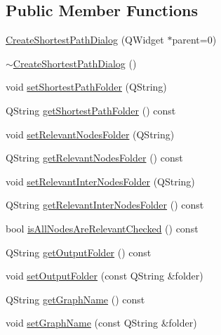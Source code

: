 \subsection*{Public Member Functions}
\begin{DoxyCompactItemize}
\item 
\mbox{\hyperlink{class_create_shortest_path_dialog_a4c0847ff271b3b53aff8c4529685cc0b}{Create\+Shortest\+Path\+Dialog}} (Q\+Widget $\ast$parent=0)
\item 
\mbox{\hyperlink{class_create_shortest_path_dialog_aeb448f0b0a0a2ebe6b38472a0bd7e3a7}{$\sim$\+Create\+Shortest\+Path\+Dialog}} ()
\item 
void \mbox{\hyperlink{class_create_shortest_path_dialog_a12534d02daec57940ade7608812e4b78}{set\+Shortest\+Path\+Folder}} (Q\+String)
\item 
Q\+String \mbox{\hyperlink{class_create_shortest_path_dialog_a7c7cf75fe1d3687fce478419751dcd21}{get\+Shortest\+Path\+Folder}} () const
\item 
void \mbox{\hyperlink{class_create_shortest_path_dialog_a1ea2b0417bf537af0c22f9778382e24d}{set\+Relevant\+Nodes\+Folder}} (Q\+String)
\item 
Q\+String \mbox{\hyperlink{class_create_shortest_path_dialog_ac5dfd0b531fbc8cf751dc39256ffe20d}{get\+Relevant\+Nodes\+Folder}} () const
\item 
void \mbox{\hyperlink{class_create_shortest_path_dialog_ad63cdc8ec6b1d5e86cb6eb293d64af78}{set\+Relevant\+Inter\+Nodes\+Folder}} (Q\+String)
\item 
Q\+String \mbox{\hyperlink{class_create_shortest_path_dialog_a324440a54aebdb621a1b92434b1c8a55}{get\+Relevant\+Inter\+Nodes\+Folder}} () const
\item 
bool \mbox{\hyperlink{class_create_shortest_path_dialog_ae111fa329a0322c102d5e1820c02a512}{is\+All\+Nodes\+Are\+Relevant\+Checked}} () const
\item 
Q\+String \mbox{\hyperlink{class_create_shortest_path_dialog_ac710a2cce4b1a46abd3dd66aeea4d1c9}{get\+Output\+Folder}} () const
\item 
void \mbox{\hyperlink{class_create_shortest_path_dialog_a0d1c4da7b21ec5761ce67a28ccc834d4}{set\+Output\+Folder}} (const Q\+String \&folder)
\item 
Q\+String \mbox{\hyperlink{class_create_shortest_path_dialog_a3050fc7ea8b6296cadb2540b6934be09}{get\+Graph\+Name}} () const
\item 
void \mbox{\hyperlink{class_create_shortest_path_dialog_a2a4fcd3390d8e372fd827c27a141db3f}{set\+Graph\+Name}} (const Q\+String \&folder)

\end{DoxyCompactItemize}
